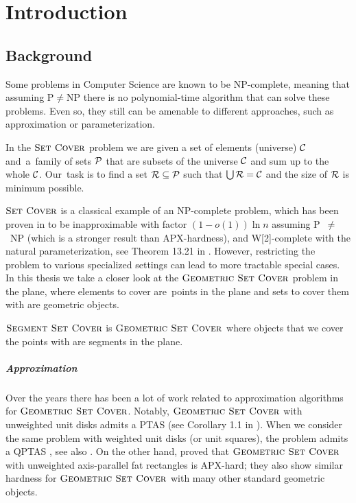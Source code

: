 \chapter{Introduction}
\section{Background}
Some problems in Computer Science are known to be NP-complete,
meaning that assuming P$\neq$NP there is no polynomial-time
algorithm that can solve these problems.
Even so, they still can be amenable to different approaches,
such as approximation or parameterization.

\begin{defi}
In the \textbf{$\textsc{Set Cover}$} problem we are given a set of elements (universe)
$\mathcal{C}$ and~a~family of sets $\mathcal{P}$ that are subsets of the universe $\mathcal{C}$
and sum up to the whole $\mathcal{C}$.
Our~task is to find a set $\mathcal{R} \subseteq \mathcal{P}$
such that $\bigcup \mathcal{R} = \mathcal{C}$ and the size of $\mathcal{R}$ is minimum possible.
\end{defi}

$\textsc{Set Cover}$ is a classical example of an NP-complete problem,
which has been proven
in \cite{set_cover_inapproximation} to be
inapproximable with factor $(1-o(1))\ln n$ assuming P~$\neq$~NP
(which is a stronger result than APX-hardness),
and W[2]-complete with the natural parameterization,
see Theorem 13.21 in \cite{platypus_book}.
However, restricting the problem to various specialized settings
can lead to more tractable special cases.
In this thesis we take a closer look at the $\textsc{Geometric Set Cover}$ problem
in the plane, where elements to cover are~points in the plane
and sets to cover them with are geometric objects.

\begin{defi}
\textbf{$\textsc{Segment Set Cover}$} is $\textsc{Geometric Set Cover}$ where
objects that we cover the points with are segments in the plane.
\end{defi}

\paragraph{Approximation}
Over the years there has been a lot of work related to approximation
algorithms for $\textsc{Geometric Set Cover}$. Notably,
$\textsc{Geometric Set Cover}$ with unweighted unit disks admits a PTAS (see
Corollary 1.1 in \cite{unit_disks}). When we consider the same problem
with weighted unit disks (or unit squares), the problem admits a QPTAS
\cite{settling_apx_hardness}, see also \cite{voronoi_true}.
On the other hand, \cite{rectangles_apx_hard} 
proved that $\textsc{Geometric Set Cover}$ with unweighted axis-parallel fat rectangles
is APX-hard; they also show similar hardness
for $\textsc{Geometric Set Cover}$ with many other standard geometric objects.

